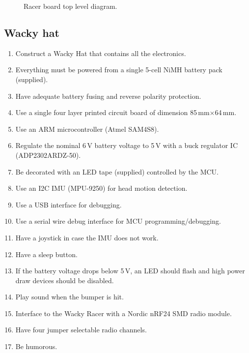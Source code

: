 \documentclass[11pt, a4paper]{article}
\begin{document}
\vspace{1cm}

\begin{figure}[h]
    \centering
    
    \caption{Racer board top level diagram.}
\end{figure}


\vfill\pagebreak

\subsection{Wacky hat}


\begin{enumerate}
\item Construct a Wacky Hat that contains all the electronics.
\item Everything must be powered from a single 5-cell NiMH battery pack (supplied).  
\item Have adequate battery fusing and reverse polarity protection.
\item Use a single four layer printed circuit board of dimension 85\,mm$\times$64\,mm.  
\item Use an ARM microcontroller (Atmel SAM4S8).
\item Regulate the nominal 6\,V battery voltage to 5\,V with a buck
  regulator IC (ADP2302ARDZ-50).
\item Be decorated with an LED tape (supplied) controlled by the MCU.
\item Use an I2C IMU (MPU-9250) for head motion detection.
\item Use a USB interface for debugging.
\item Use a serial wire debug interface for MCU programming/debugging.
\item Have a joystick in case the IMU does not work.
\item Have a sleep button.
\item If the battery voltage drops below 5\,V, an LED should flash and high power draw devices should be disabled.
\item Play sound when the bumper is hit.
\item Interface to the Wacky Racer with a Nordic nRF24 SMD radio module.  
\item Have four jumper selectable radio channels.    
\item Be humorous.  
\end{enumerate}

\end{document}
